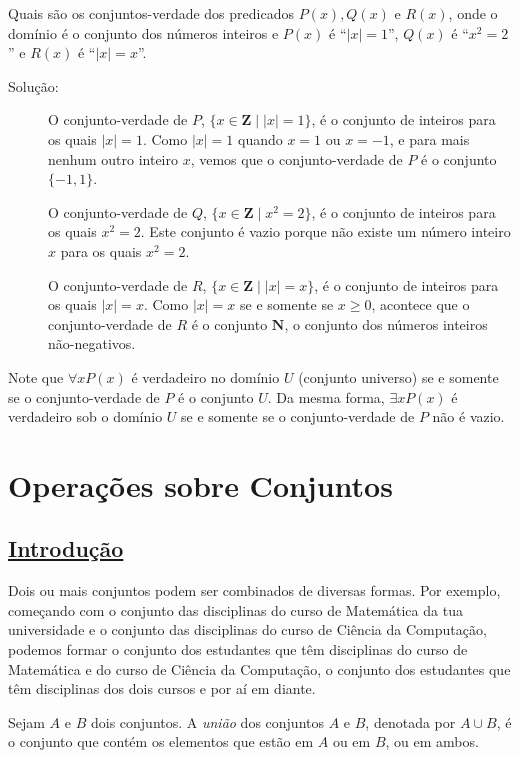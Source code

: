 \begin{exmp}
\label{exem318}
Quais são os conjuntos-verdade dos predicados $P(x), Q(x)$ e $R(x)$, onde o
domínio é o conjunto dos números inteiros e $P(x)$ é ``$|x| = 1$'', $Q(x)$ é
``$x^2 = 2$'' e $R(x)$ é ``$|x| = x$''.
\begin{description}
\item[Solução:]O conjunto-verdade de $P$, $\{x \in \textbf{Z} \mid |x| = 1\}$, é
o conjunto de inteiros para os quais $|x| = 1$. Como $|x| = 1$ quando $x=1$ ou
$x=-1$, e para mais nenhum outro inteiro $x$, vemos que o conjunto-verdade de
$P$ é o conjunto $\{-1,1\}$.

O conjunto-verdade de $Q$, $\{x \in \textbf{Z} \mid x^2 = 2\}$, é o conjunto de
inteiros para os quais $x^2 = 2$. Este conjunto é vazio porque não existe um
número inteiro $x$ para os quais $x^2 = 2$.

O conjunto-verdade de $R$, $\{x \in \textbf{Z} \mid |x| = x\}$, é o conjunto de
inteiros para os quais $|x| = x$. Como $|x| = x$ se e somente se $x \geq 0$,
acontece que o conjunto-verdade de $R$ é o conjunto $\textbf{N}$, o conjunto
dos números inteiros não-negativos.
\end{description}
\end{exmp}

Note que $\forall xP(x)$ é verdadeiro no domínio $U$ (conjunto universo) se e
somente se o conjunto-verdade de $P$ é o conjunto $U$. Da mesma forma, $\exists
xP(x)$ é verdadeiro sob o domínio $U$ se e somente se o conjunto-verdade de $P$
não é vazio.

\section{Operações sobre Conjuntos}

\subsection*{\underline{Introdução}}

Dois ou mais conjuntos podem ser combinados de diversas formas. Por exemplo,
começando com o conjunto das disciplinas do curso de Matemática da tua
universidade e o conjunto das disciplinas do curso de Ciência da Computação,
podemos formar o conjunto dos estudantes que têm disciplinas do curso de
Matemática e do curso de Ciência da Computação, o conjunto dos estudantes que
têm disciplinas dos dois cursos e por aí em diante.

\begin{defn}
\label{def310}
Sejam $A$ e $B$ dois conjuntos. A \emph{união} dos conjuntos $A$ e $B$, denotada
por $A \cup B$, é o conjunto que contém os elementos que estão em $A$ ou em $B$,
ou em ambos.
\end{defn}

